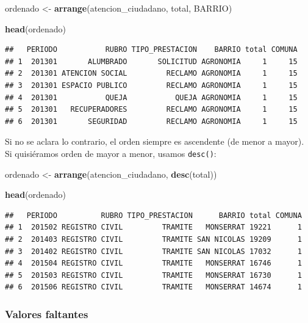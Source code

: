 \documentclass[spanish,]{book}
\newenvironment{Shaded}{\begin{snugshade}}{\end{snugshade}}
\newcommand{\KeywordTok}[1]{\textcolor[rgb]{0.13,0.29,0.53}{\textbf{#1}}}
\newcommand{\NormalTok}[1]{#1}
\newcommand{\StringTok}[1]{\textcolor[rgb]{0.31,0.60,0.02}{#1}}
\begin{document}
\begin{Shaded}
\begin{Highlighting}[]
\NormalTok{ordenado <-}\StringTok{ }\KeywordTok{arrange}\NormalTok{(atencion_ciudadano, total, BARRIO)}

\KeywordTok{head}\NormalTok{(ordenado)}
\end{Highlighting}
\end{Shaded}

\begin{verbatim}
##   PERIODO           RUBRO TIPO_PRESTACION    BARRIO total COMUNA
## 1  201301       ALUMBRADO       SOLICITUD AGRONOMIA     1     15
## 2  201301 ATENCION SOCIAL         RECLAMO AGRONOMIA     1     15
## 3  201301 ESPACIO PUBLICO         RECLAMO AGRONOMIA     1     15
## 4  201301           QUEJA           QUEJA AGRONOMIA     1     15
## 5  201301   RECUPERADORES         RECLAMO AGRONOMIA     1     15
## 6  201301       SEGURIDAD         RECLAMO AGRONOMIA     1     15
\end{verbatim}

Si no se aclara lo contrario, el orden siempre es ascendente (de menor a mayor). Si quisiéramos orden de mayor a menor, usamos \texttt{desc()}:

\begin{Shaded}
\begin{Highlighting}[]
\NormalTok{ordenado <-}\StringTok{ }\KeywordTok{arrange}\NormalTok{(atencion_ciudadano, }\KeywordTok{desc}\NormalTok{(total))}

\KeywordTok{head}\NormalTok{(ordenado)}
\end{Highlighting}
\end{Shaded}

\begin{verbatim}
##   PERIODO          RUBRO TIPO_PRESTACION      BARRIO total COMUNA
## 1  201502 REGISTRO CIVIL         TRAMITE   MONSERRAT 19221      1
## 2  201403 REGISTRO CIVIL         TRAMITE SAN NICOLAS 19209      1
## 3  201402 REGISTRO CIVIL         TRAMITE SAN NICOLAS 17032      1
## 4  201504 REGISTRO CIVIL         TRAMITE   MONSERRAT 16746      1
## 5  201503 REGISTRO CIVIL         TRAMITE   MONSERRAT 16730      1
## 6  201506 REGISTRO CIVIL         TRAMITE   MONSERRAT 14674      1
\end{verbatim}

\hypertarget{valores-faltantes}{%
\subsubsection{Valores faltantes}\label{valores-faltantes}}
\end{document}

